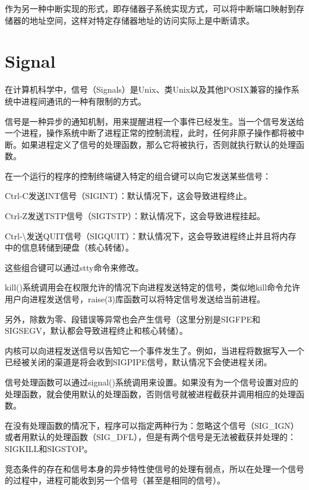 作为另一种中断实现的形式，即存储器子系统实现方式，可以将中断端口映射到存储器的地址空间，这样对特定存储器地址的访问实际上是中断请求。




\section{Signal}

在计算机科学中，信号（Signals）是Unix、类Unix以及其他POSIX兼容的操作系统中进程间通讯的一种有限制的方式。

信号是一种异步的通知机制，用来提醒进程一个事件已经发生。当一个信号发送给一个进程，操作系统中断了进程正常的控制流程，此时，任何非原子操作都将被中断。如果进程定义了信号的处理函数，那么它将被执行，否则就执行默认的处理函数。

在一个运行的程序的控制终端键入特定的组合键可以向它发送某些信号：

\begin{compactitem}
\item Ctrl-C发送INT信号（SIGINT）：默认情况下，这会导致进程终止。
\item Ctrl-Z发送TSTP信号（SIGTSTP）：默认情况下，这会导致进程挂起。
\item Ctrl-\textbackslash 发送QUIT信号（SIGQUIT）：默认情况下，这会导致进程终止并且将内存中的信息转储到硬盘（核心转储）。
\item 这些组合键可以通过stty命令来修改。
\end{compactitem}

kill()系统调用会在权限允许的情况下向进程发送特定的信号，类似地kill命令允许用户向进程发送信号，raise(3)库函数可以将特定信号发送给当前进程。

另外，除数为零、段错误等异常也会产生信号（这里分别是SIGFPE和SIGSEGV，默认都会导致进程终止和核心转储）。

内核可以向进程发送信号以告知它一个事件发生了。例如，当进程将数据写入一个已经被关闭的渠道是将会收到SIGPIPE信号，默认情况下会使进程关闭。

信号处理函数可以通过signal()系统调用来设置。如果没有为一个信号设置对应的处理函数，就会使用默认的处理函数，否则信号就被进程截获并调用相应的处理函数。

在没有处理函数的情况下，程序可以指定两种行为：忽略这个信号（SIG\_IGN）或者用默认的处理函数（SIG\_DFL），但是有两个信号是无法被截获并处理的：SIGKILL和SIGSTOP。

竞态条件的存在和信号本身的异步特性使信号的处理有弱点，所以在处理一个信号的过程中，进程可能收到另一个信号（甚至是相同的信号）。

